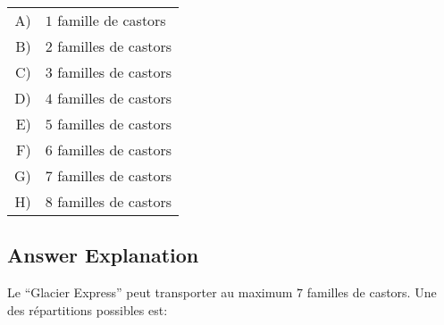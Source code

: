 \documentclass[a4paper,11pt]{report}
\begin{document}
\begin{tabular}{ @{} r l @{} }
  A) & $1$ famille de castors \\ 
  B) & $2$ familles de castors \\ 
  C) & $3$ familles de castors \\ 
  D) & $4$ familles de castors \\ 
  E) & $5$ familles de castors \\ 
  F) & $6$ familles de castors \\ 
  G) & $7$ familles de castors \\ 
  H) & $8$ familles de castors
\end{tabular}

\endgroup

\subsection*{Answer Explanation}

Le “Glacier Express” peut transporter au maximum $7$ familles de castors. Une des répartitions possibles est:
\end{document}
